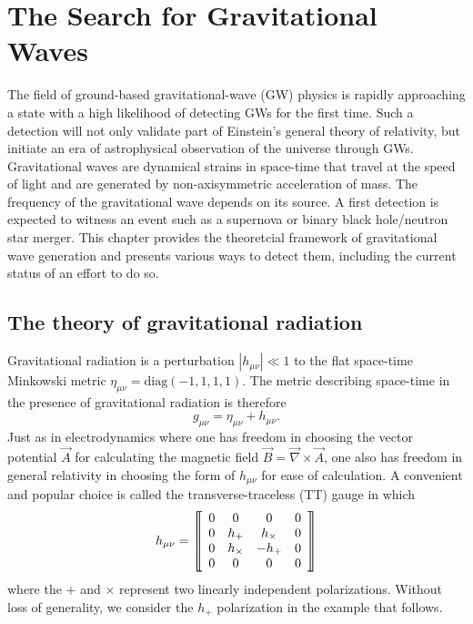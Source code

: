 \chapter{The Search for Gravitational Waves}

The field of ground-based gravitational-wave (GW) physics is rapidly
approaching a state with a high likelihood of detecting GWs for the
first time. Such a detection will not only validate part of Einstein's
general theory of relativity, but initiate an era of astrophysical
observation of the universe through GWs. Gravitational waves are
dynamical strains in space-time that travel at the speed of light and
are generated by non-axisymmetric acceleration of mass. The frequency
of the gravitational wave depends on its source. A first detection is
expected to witness an event such as a supernova or binary black
hole/neutron star merger. This chapter provides the theoretcial
framework of gravitational wave generation and presents various ways
to detect them, including the current status of an effort to do so.

\section{The theory of gravitational radiation}
Gravitational radiation is a perturbation $|h_{\mu \nu}|
\ll 1$ to the flat space-time Minkowski metric $\eta_{\mu \nu} =
\mbox{diag}(-1, 1, 1, 1)$. The metric describing space-time in the
presence of gravitational radiation is therefore
\begin{equation}
g_{\mu\nu} = \eta_{\mu\nu} + h_{\mu\nu}.
\end{equation}
Just as in electrodynamics where one has freedom in choosing the
vector potential $\vec{A}$ for calculating the magnetic field $\vec{B}
= \vec{\nabla} \times \vec{A}$, one also has freedom in general
relativity in choosing the form of $h_{\mu \nu}$ for ease of calculation. A
convenient and popular choice is called the transverse-traceless (TT)
gauge in which
\begin{equation}
h_{\mu \nu} = 
\left\llbracket \begin{array}{c c c c} 
0 & 0 & 0 & 0\\ 
0 & h_+ & h_\times & 0 \\
0 & h_\times & -h_+ & 0 \\
0 & 0 & 0 & 0
\end{array} \right\rrbracket
\end{equation}
where the $+$ and $\times$ represent two linearly independent
polarizations. Without loss of generality, we consider the $h_+$
polarization in the example that follows.

